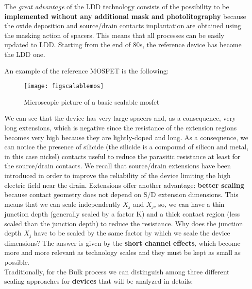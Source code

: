 \documentclass[a4paper, 12pt, twoside, openright]{report}
\begin{document}
The \emph{great advantage} of the LDD technology consists of the possibility to be \textbf{implemented without any additional mask and photolitography} because the oxide deposition and source/drain contacts implantation are obtained using the masking action of spacers. This means that all processes can be easily updated to LDD. Starting from the end of 80s, the reference device has become the LDD one. 

An example of the reference MOSFET is the following:

	\begin{figure}[H]
	\centering
	\texttt{[image: figscalablemos]}
	\caption{Microscopic picture of a basic scalable mosfet}
	\label{}
	\end{figure}

We can see that the device has very large spacers and, as a consequence, very long extensions, which is negative since the resistance of the extension regions becomes very high because they are lightly-doped and long. As a consequence, we can notice the presence of silicide (the silicide is a compound of silicon and metal, in this case nickel) contacts useful to reduce the parasitic resistance at least for the source/drain contacts. We recall that source/drain extensions have been introduced in order to improve the reliability of the device limiting the high electric field near the drain. Extensions offer another advantage: \textbf{better scaling} because contact geometry does not depend on S/D extension dimensions. This means that we can scale independently $X_{j}$ and $X_{jc}$ so, we can have a thin junction depth (generally scaled by a factor K) and a thick contact region (less scaled than the junction depth) to reduce the resistance. Why does the junction depth $X_{j}$ have to be scaled by the same factor by which we scale the device dimensions? The answer is given by the \textbf{short channel effects}, which become more and more relevant as technology scales and they must be kept as small as possible. \\

Traditionally, for the Bulk process we can distinguish among three different scaling approaches for \textbf{devices} that will be analyzed in details:
\end{document}
